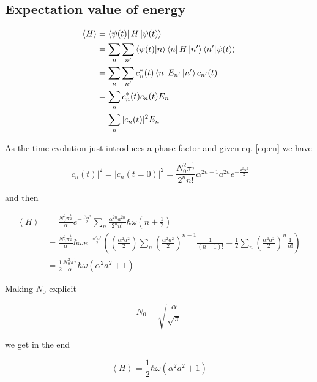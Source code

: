 \documentclass{article}
\begin{document}
\subsection{Expectation value of energy}

\begin{align}
\left\langle H \right\rangle & = \bra{\psi(t)} H \ket{\psi(t)} \nonumber \\
& = \sum_n \sum_{n'} \braket{\psi(t)}{n}\bra{n} H \ket{n'}\braket{n'}{\psi(t)} \nonumber \\
& = \sum_n \sum_{n'} c_n^*(t) \bra{n} E_{n'} \ket{n'} c_{n'}(t) \nonumber \\
& = \sum_n c_n^*(t) c_n(t) E_n \nonumber \\
& = \sum_n |c_n(t)|^2 E_n 
\end{align}

As the time evolution just introduces a phase factor and given eq. \eqref{eq:cn} we have

\begin{equation}
|c_n(t)|^2 = |c_n(t=0)|^2 = \frac{N_0^2 \pi^{\frac{1}{2}}}{2^n n!} \alpha^{2n-1}a^{2n} e^{-\frac{a^2\alpha^2}{2}}
\end{equation}

and then

\begin{align}
\left\langle H \right\rangle & = \frac{N_0^2 \pi^{\frac{1}{2}}}{\alpha} e^{-\frac{a^2\alpha^2}{2}} \sum_n \frac{\alpha^{2n} a^{2n}}{2^n n!} \hbar \omega \left(n + \frac{1}{2} \right) \nonumber \\
& = \frac{N_0^2 \pi^{\frac{1}{2}}}{\alpha} \hbar \omega  e^{-\frac{a^2\alpha^2}{2}} \left( \left(\frac{\alpha^{2} a^{2}}{2}\right) \sum_n \left(\frac{\alpha^{2} a^{2}}{2}\right)^{n-1} \frac{1}{(n-1)!} + \frac{1}{2} \sum_n \left(\frac{\alpha^{2} a^{2}}{2}\right)^n \frac{1}{n!} \right) \nonumber \\
& = \frac{1}{2} \frac{N_0^2 \pi^{\frac{1}{2}}}{\alpha} \hbar \omega \left(\alpha^2 a^2 +1 \right)
\end{align}

Making \(N_0\) explicit

\begin{equation}
N_0 = \sqrt{\frac{\alpha}{\sqrt{\pi}}}
\end{equation}

we get in the end

\begin{equation}
\left\langle H \right\rangle = \frac{1}{2} \hbar \omega \left(\alpha^2 a^2 +1 \right)
\end{equation}
\end{document}
